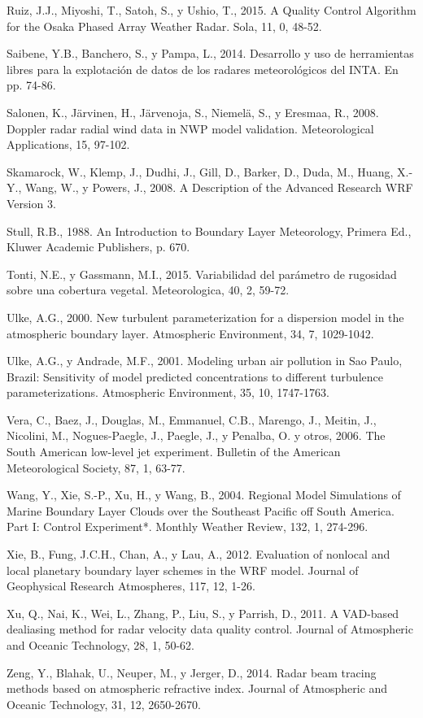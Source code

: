 \documentclass[12pt,spanish,oneside]{book}
\begin{document}
\hypertarget{ref-Ruiz2015}{}
Ruiz, J.J., Miyoshi, T., Satoh, S., y Ushio, T., 2015. A Quality Control
Algorithm for the Osaka Phased Array Weather Radar. Sola, 11, 0, 48-52.

\hypertarget{ref-Saibene2014}{}
Saibene, Y.B., Banchero, S., y Pampa, L., 2014. Desarrollo y uso de
herramientas libres para la explotación de datos de los radares
meteorológicos del INTA. En pp. 74-86.

\hypertarget{ref-Salonen2008}{}
Salonen, K., Järvinen, H., Järvenoja, S., Niemelä, S., y Eresmaa, R.,
2008. Doppler radar radial wind data in NWP model validation.
Meteorological Applications, 15, 97-102.

\hypertarget{ref-Skamarock2008}{}
Skamarock, W., Klemp, J., Dudhi, J., Gill, D., Barker, D., Duda, M.,
Huang, X.-Y., Wang, W., y Powers, J., 2008. A Description of the
Advanced Research WRF Version 3.

\hypertarget{ref-Stull1988}{}
Stull, R.B., 1988. An Introduction to Boundary Layer Meteorology,
Primera Ed., Kluwer Academic Publishers, p. 670.

\hypertarget{ref-Tonti2015}{}
Tonti, N.E., y Gassmann, M.I., 2015. Variabilidad del parámetro de
rugosidad sobre una cobertura vegetal. Meteorologica, 40, 2, 59-72.

\hypertarget{ref-Ulke2000}{}
Ulke, A.G., 2000. New turbulent parameterization for a dispersion model
in the atmospheric boundary layer. Atmospheric Environment, 34, 7,
1029-1042.

\hypertarget{ref-Ulke2001}{}
Ulke, A.G., y Andrade, M.F., 2001. Modeling urban air pollution in Sao
Paulo, Brazil: Sensitivity of model predicted concentrations to
different turbulence parameterizations. Atmospheric Environment, 35, 10,
1747-1763.

\hypertarget{ref-Vera2006}{}
Vera, C., Baez, J., Douglas, M., Emmanuel, C.B., Marengo, J., Meitin,
J., Nicolini, M., Nogues-Paegle, J., Paegle, J., y Penalba, O. y otros,
2006. The South American low-level jet experiment. Bulletin of the
American Meteorological Society, 87, 1, 63-77.

\hypertarget{ref-Wang2004}{}
Wang, Y., Xie, S.-P., Xu, H., y Wang, B., 2004. Regional Model
Simulations of Marine Boundary Layer Clouds over the Southeast Pacific
off South America. Part I: Control Experiment*. Monthly Weather Review,
132, 1, 274-296.

\hypertarget{ref-Xie2012}{}
Xie, B., Fung, J.C.H., Chan, A., y Lau, A., 2012. Evaluation of nonlocal
and local planetary boundary layer schemes in the WRF model. Journal of
Geophysical Research Atmospheres, 117, 12, 1-26.

\hypertarget{ref-Xu2011}{}
Xu, Q., Nai, K., Wei, L., Zhang, P., Liu, S., y Parrish, D., 2011. A
VAD-based dealiasing method for radar velocity data quality control.
Journal of Atmospheric and Oceanic Technology, 28, 1, 50-62.

\hypertarget{ref-Zeng2014}{}
Zeng, Y., Blahak, U., Neuper, M., y Jerger, D., 2014. Radar beam tracing
methods based on atmospheric refractive index. Journal of Atmospheric
and Oceanic Technology, 31, 12, 2650-2670.
\end{document}
